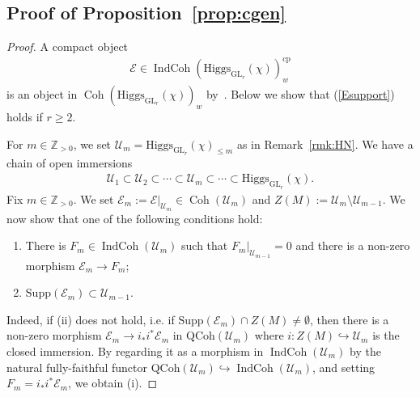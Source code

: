 \documentclass [11pt,oneside,a4paper,mathscr]{amsart}
\theoremstyle{definition}
\renewcommand{\leq}{\leqslant}
\renewcommand{\geq}{\geqslant}
\newcommand{\Coh}{\operatorname{Coh}}
\newcommand{\IndCoh}{\operatorname{IndCoh}}
\newcommand{\GL}{\operatorname{GL}}
\newcommand{\Hig}{\mathrm{Higgs}}
\begin{document}
\subsection{Proof of Proposition~\ref{prop:cgen}}\label{pf:prop}
\begin{proof}
A compact object \begin{align*}\mathcal{E}\in\IndCoh(\Hig_{\GL_r}(\chi))_w^{\mathrm{cp}}\end{align*} is an object in $\Coh(\Hig_{\GL_r}(\chi))_w$
by~\cite[Proposition~3.4.2]{MR3037900}. Below we show that (\ref{Esupport}) holds 
if $r\geq 2$. 

For $m\in \mathbb{Z}_{>0}$, we set 
$\mathcal{U}_m=\Hig_{\GL_r}(\chi)_{\leq m}$ as in Remark~\ref{rmk:HN}.
We have a chain of open immersions 
\begin{align*}
    \mathcal{U}_1 \subset \mathcal{U}_2 \subset \cdots \subset 
    \mathcal{U}_m \subset \cdots \subset \Hig_{\GL_r}(\chi). 
\end{align*}
Fix $m\in \mathbb{Z}_{>0}$.
    We set $\mathcal{E}_m:=\mathcal{E}|_{\mathcal{U}_m}
    \in \Coh(\mathcal{U}_m)$ and $Z(M):=\mathcal{U}_m \setminus \mathcal{U}_{m-1}$. 
We now show that one of the following 
conditions hold: 
\begin{enumerate}
    \item There is $F_m \in \IndCoh(\mathcal{U}_m)$ such that $F_m|_{\mathcal{U}_{m-1}}=0$
    and there is a non-zero morphism $\mathcal{E}_m \to F_m$; 
    \item $\mathrm{Supp}(\mathcal{E}_m) \subset \mathcal{U}_{m-1}$. 
\end{enumerate}

Indeed, if (ii) does not hold, i.e. if $\mathrm{Supp}(\mathcal{E}_m) \cap Z(M) \neq \emptyset$, 
then there is a non-zero morphism 
$\mathcal{E}_m \to i_{*}i^{*}\mathcal{E}_m$
in $\mathrm{QCoh}(\mathcal{U}_m)$
where $i \colon Z(M) \hookrightarrow \mathcal{U}_m$ is the closed 
immersion. 
By regarding it as a morphism in $\IndCoh(\mathcal{U}_m)$
by the natural fully-faithful functor $\mathrm{QCoh}(\mathcal{U}_m)\hookrightarrow 
\IndCoh(\mathcal{U}_m)$, and setting $F_m=i_{*}i^{*}\mathcal{E}_m$, 
we obtain (i). 


\end{proof}
\end{document}
